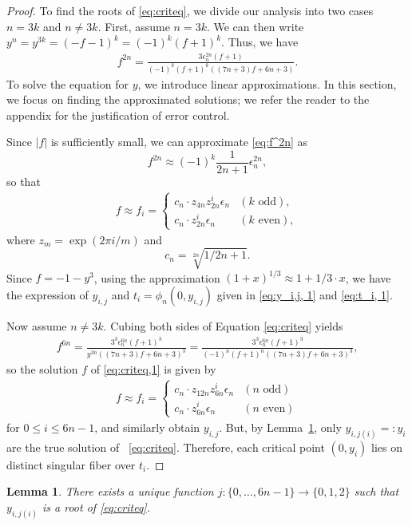 \documentclass[10pt,a4paper,reqno]{amsart}
\newtheorem{lem}[thm]{Lemma}
\theoremstyle{definition}
\numberwithin{equation}{section}
\numberwithin{figure}{section}
\newcommand{\ep}{\epsilon}
\newcommand{\arrowr}{\rightarrow}
\begin{document}
\begin{proof}
To find the roots of \eqref{eq:criteq}, we divide our analysis into two cases $n=3k$ and $n\neq 3k$.
First, assume $n=3k$.
We can then write $y^n=y^{3k}=(-f-1)^k=(-1)^k(f+1)^k$.
Thus, we have 
\begin{align} \label{eq:f^2n}
f^{2n}=\frac{3{\ep_n^{2n}}(f+1)}{(-1)^k(f+1)^k ((7n+3)f+6n+3)}.
\end{align}
To solve the equation for $y$, we introduce linear approximations.
In this section, we focus on finding the approximated solutions;
we refer the reader to the appendix for the justification of error control.

Since $|f|$ is sufficiently small, we can approximate \eqref{eq:f^2n} as
\[ f^{2n} \approx (-1)^k \frac{1}{2n+1} {\ep_n^{2n}},\]
so that 
\begin{align} \label{eq:f_i, 1}
f\approx f_i = \begin{cases} c_n \cdot z_{4n}z_{2n}^i {\ep_n}  & (k \text{ odd}),\\  c_n \cdot z_{2n}^i {\ep_n} & (k \text{ even}),\end{cases}
\end{align}
where $z_m=\exp(2\pi i /m)$ and
\[c_n=\sqrt[2n]{1/2n+1}.\]
Since $f=-1-y^3$, using the approximation $(1+x)^{1/3}\approx 1+1/3\cdot x$, 
we have the expression of $y_{i,j}$ and $t_i=\phi_n(0,y_{i,j})$ given in \eqref{eq:y_i,j, 1} and \eqref{eq:t_i, 1}.

Now assume $n\neq 3k$.
Cubing both sides of Equation \eqref{eq:criteq} yields
\begin{align}\label{eq:criteq,1}
f^{6n}=\frac{3^3{\ep_n^{6n}}(f+1)^3}{y^{3n} ((7n+3)f+6n+3)^3}=\frac{3^3{\ep_n^{6n}}(f+1)^3}{(-1)^n(f+1)^n ((7n+3)f+6n+3)^3},
\end{align}
so the solution $f$ of \eqref{eq:criteq,1} is given by
\begin{align}\label{eq:f_i, 2}
f\approx f_i= \begin{cases} c_n\cdot z_{12n} z_{6n}^i {\ep_n} & (n \text{ odd}) \\ c_n \cdot z_{6n}^i {\ep_n} & (n \text{ even}) \end{cases}
\end{align}
for $0\le i \le 6n-1$,
and similarly obtain $y_{i,j}$.
But, by Lemma~\ref{lem:j(i)}, only $y_{i,j(i)}=:y_i$ are the true solution of ~\eqref{eq:criteq}.
Therefore, each critical point $(0,y_i)$ lies on distinct singular fiber over $t_i$.
\end{proof}

\begin{lem}\label{lem:j(i)}
There exists a unique function $j: \{0,\dots, 6n-1 \} \arrowr \{0,1,2 \}$ such that $y_{i,j(i)}$ is a root of \eqref{eq:criteq}.
\end{lem}
\end{document}
